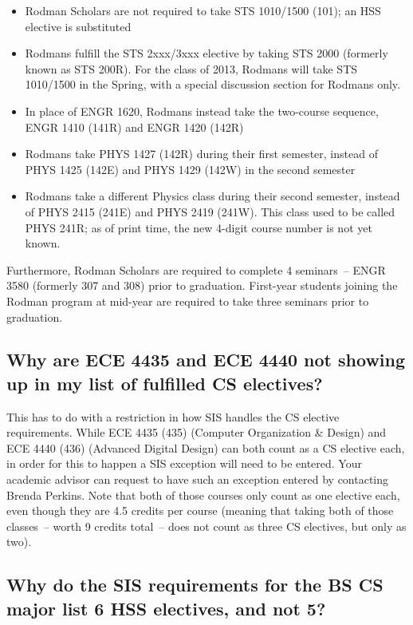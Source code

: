 \documentclass[10pt,letter]{book}
\newenvironment{itemlist}{
\begin{itemize}
\setlength{\itemsep}{0pt}
\setlength{\parskip}{0pt}}
{\end{itemize}}
\newcommand{\sisexceptionenterer}{Brenda Perkins}
\begin{document}
\begin{itemlist}
\item Rodman Scholars are not required to take STS 1010/1500 (101); an HSS
elective is substituted
\item Rodmans fulfill the STS 2xxx/3xxx elective by taking STS 2000
  (formerly known as STS 200R). For the class of 2013, Rodmans will
  take STS 1010/1500 in the Spring, with a special discussion section for
  Rodmans only.
\item In place of ENGR 1620, Rodmans instead take the two-course
  sequence, ENGR 1410 (141R) and ENGR 1420 (142R)
\item Rodmans take PHYS 1427 (142R) during their first semester,
  instead of PHYS 1425 (142E) and PHYS 1429 (142W) in the second
  semester
\item Rodmans take a different Physics class during their second
  semester, instead of PHYS 2415 (241E) and PHYS 2419 (241W). This
  class used to be called PHYS 241R; as of print time, the new 4-digit
  course number is not yet known.
\end{itemlist}

Furthermore, Rodman Scholars are required to complete 4 seminars~--
ENGR 3580 (formerly 307 and 308) prior to graduation. First-year
students joining the Rodman program at mid-year are required to take
three seminars prior to graduation.

\subsection{Why are ECE 4435 and ECE 4440 not showing up in my list of
  fulfilled CS electives?}
\label{sec:sisece4435issue}

This has to do with a restriction in how SIS handles the CS elective
requirements.  While ECE 4435 (435) (Computer Organization \& Design)
and ECE 4440 (436) (Advanced Digital Design) can both count as a CS
elective each, in order for this to happen a SIS exception will need
to be entered.  Your academic advisor can request to have such an
exception entered by contacting \sisexceptionenterer.  Note that both
of those courses only count as one elective each, even though they are
4.5 credits per course (meaning that taking both of those classes~--
worth 9 credits total~-- does not count as three CS electives, but
only as two).

\subsection{Why do the SIS requirements for the BS CS major list 6 HSS
  electives, and not 5?}
\label{sec:sishssissue}
\end{document}
